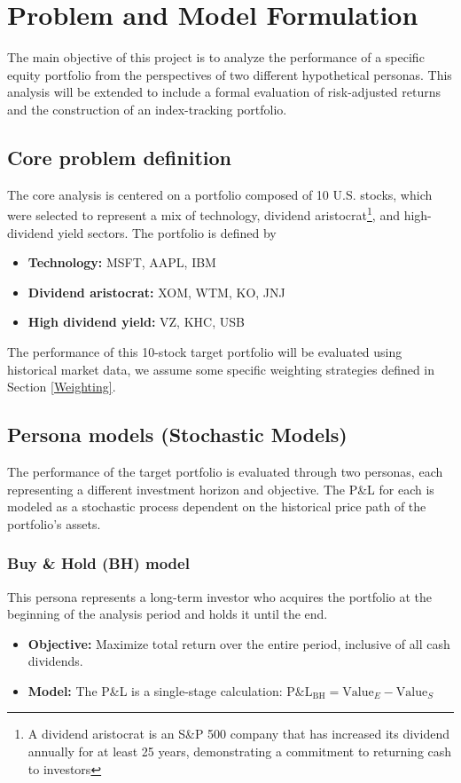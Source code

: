 \documentclass[12pt, a4paper]{article}
\begin{document}
	
	\section{Problem and Model Formulation}
	
	The main objective of this project is to analyze the performance of a specific equity portfolio from the perspectives of two different hypothetical personas. This analysis will be extended to include a formal evaluation of risk-adjusted returns and the construction of an index-tracking portfolio. 
	
	\subsection{Core problem definition}
	The core analysis is centered on a portfolio composed of 10 U.S. stocks, which were selected to represent a mix of technology, dividend aristocrat\footnote{A dividend aristocrat is an S\&P 500 company that has increased its dividend annually for at least 25 years, demonstrating a commitment to returning cash to investors}, and high-dividend yield sectors. The portfolio is defined by
	\begin{itemize}
		\item \textbf{Technology:} MSFT, AAPL, IBM
		\item \textbf{Dividend aristocrat:} XOM, WTM, KO, JNJ
		\item \textbf{High dividend yield:} VZ, KHC, USB
	\end{itemize}
	The performance of this 10-stock target portfolio will be evaluated using historical market data, we assume some specific weighting strategies defined in Section \ref{Weighting}. 
	
	\subsection{Persona models (Stochastic Models)}
	The performance of the target portfolio is evaluated through two personas, each representing a different investment horizon and objective. The P\&L for each is modeled as a stochastic process dependent on the historical price path of the portfolio's assets.
	
	\subsubsection{Buy \& Hold (BH) model}
	This persona represents a long-term investor who acquires the portfolio at the beginning of the analysis period and holds it until the end.
	\begin{itemize}
		\item \textbf{Objective:} Maximize total return over the entire period, inclusive of all cash dividends. 
		\item \textbf{Model:} The P\&L is a single-stage calculation: $\text{P\&L}_\text{BH} = \text{Value}_{E} - \text{Value}_{S}$
	\end{itemize}
	
\end{document}
